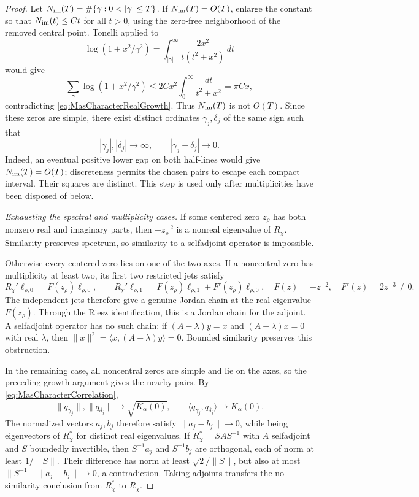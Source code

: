 \documentclass[11pt,a4paper]{article}
\begin{document}
\begin{proof}
Let $N_{\rm im}(T)=\#\{\gamma:0<|\gamma|\le T\}$. If $N_{\rm im}(T)=O(T)$, enlarge the constant so that $N_{\rm im}(t)\le Ct$ for all $t>0$, using the zero-free neighborhood of the removed central point. Tonelli applied to
\[
 \log(1+x^2/\gamma^2)
 =\int_{|\gamma|}^{\infty}\frac{2x^2}{t(t^2+x^2)}\,dt
\]
would give
\[
 \sum_\gamma\log(1+x^2/\gamma^2)
 \le2Cx^2\int_0^\infty\frac{dt}{t^2+x^2}=\pi Cx,
\]
contradicting \eqref{eq:MasCharacterRealGrowth}. Thus $N_{\rm im}(T)$ is not $O(T)$. Since these zeros are simple, there exist distinct ordinates $\gamma_j,\delta_j$ of the same sign such that
\[
 |\gamma_j|,|\delta_j|\longrightarrow\infty,
 \qquad |\gamma_j-\delta_j|\longrightarrow0.
\]
Indeed, an eventual positive lower gap on both half-lines would give $N_{\rm im}(T)=O(T)$; discreteness permits the chosen pairs to escape each compact interval. Their squares are distinct. This step is used only after multiplicities have been disposed of below.

\emph{Exhausting the spectral and multiplicity cases.}
If some centered zero $z_\rho$ has both nonzero real and imaginary parts, then $-z_\rho^{-2}$ is a nonreal eigenvalue of $R_\chi$. Similarity preserves spectrum, so similarity to a selfadjoint operator is impossible.

Otherwise every centered zero lies on one of the two axes. If a noncentral zero has multiplicity at least two, its first two restricted jets satisfy
\[
 R_\chi'\ell_{\rho,0}=F(z_\rho)\ell_{\rho,0},\qquad
 R_\chi'\ell_{\rho,1}=F(z_\rho)\ell_{\rho,1}
                          +F'(z_\rho)\ell_{\rho,0},
 \quad F(z)=-z^{-2},\quad F'(z)=2z^{-3}\ne0.
\]
The independent jets therefore give a genuine Jordan chain at the real eigenvalue $F(z_\rho)$. Through the Riesz identification, this is a Jordan chain for the adjoint. A selfadjoint operator has no such chain: if $(A-\lambda)y=x$ and $(A-\lambda)x=0$ with real $\lambda$, then $\|x\|^2=\langle x,(A-\lambda)y\rangle=0$. Bounded similarity preserves this obstruction.

In the remaining case, all noncentral zeros are simple and lie on the axes, so the preceding growth argument gives the nearby pairs. By \eqref{eq:MasCharacterCorrelation},
\[
 \|q_{\gamma_j}\|,\|q_{\delta_j}\|\to\sqrt{K_\alpha(0)},
 \qquad \langle q_{\gamma_j},q_{\delta_j}\rangle\to K_\alpha(0).
\]
The normalized vectors $a_j,b_j$ therefore satisfy $\|a_j-b_j\|\to0$, while being eigenvectors of $R_\chi^*$ for distinct real eigenvalues.
If $R_\chi^*=SAS^{-1}$ with $A$ selfadjoint and $S$ boundedly invertible, then $S^{-1}a_j$ and $S^{-1}b_j$ are orthogonal, each of norm at least $1/\|S\|$. Their difference has norm at least $\sqrt2/\|S\|$, but also at most $\|S^{-1}\|\|a_j-b_j\|\to0$, a contradiction. Taking adjoints transfers the no-similarity conclusion from $R_\chi^*$ to $R_\chi$.


\end{proof}
\end{document}
